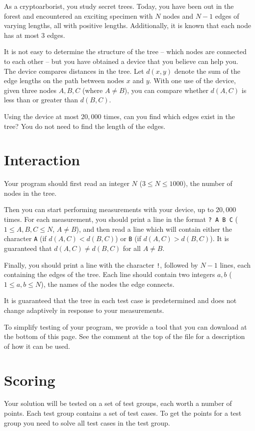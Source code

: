 As a cryptoarborist, you study secret trees.
Today, you have been out in the forest and encountered an exciting specimen with $N$ nodes
and $N-1$ edges of varying lengths, all with positive lengths.
Additionally, it is known that each node has at most $3$ edges.

It is not easy to determine the structure of the tree --
which nodes are connected to each other --
but you have obtained a device that you believe can help you.
The device compares distances in the tree.
Let $d(x, y)$ denote the sum of the edge lengths on the path between nodes $x$ and $y$.
With one use of the device, given three nodes $A, B, C$ (where $A \neq B$), you can compare whether $d(A, C)$
is less than or greater than $d(B, C)$.

Using the device at most $20,000$ times, can you find which edges exist in the tree?
You do not need to find the length of the edges.

\section*{Interaction}
Your program should first read an integer $N$ ($3 \leq N \leq 1000$), the number of nodes in the tree.

Then you can start performing measurements with your device, up to $20,000$ times.
For each measurement, you should print a line in the format \texttt{? A B C} ($1 \leq A, B, C \leq N$, $A \neq B$),
and then read a line which will contain either the character \texttt{A} (if $d(A, C) < d(B, C)$) or \texttt{B} (if $d(A, C) > d(B, C)$).
It is guaranteed that $d(A, C) \neq d(B, C)$ for all $A \neq B$.

Finally, you should print a line with the character \texttt{!}, followed by $N-1$ lines, each containing the edges of the tree.
Each line should contain two integers $a, b$ ($1 \leq a, b \leq N$), the names of the nodes the edge connects.

It is guaranteed that the tree in each test case is predetermined and does not change adaptively in response to your measurements.

To simplify testing of your program, we provide a tool that you can download at the bottom of this page.
See the comment at the top of the file for a description of how it can be used.

\section*{Scoring}
Your solution will be tested on a set of test groups, each worth a number of points. Each test group contains
a set of test cases. To get the points for a test group you need to solve all test cases in the test group.


